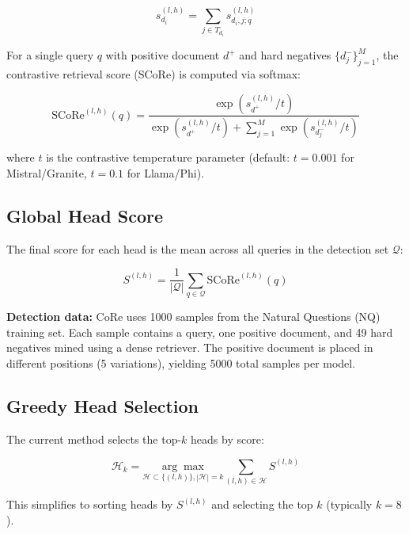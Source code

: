 \documentclass[11pt,a4paper]{article}
\begin{document}
\begin{equation}
    s^{(l,h)}_{d_i} = \sum_{j \in T_{d_i}} s^{(l,h)}_{d_i,j;q}
\end{equation}

For a single query $q$ with positive document $d^+$ and hard negatives $\{d^-_j\}_{j=1}^{M}$, the contrastive retrieval score (SCoRe) is computed via softmax:

\begin{equation}
    \text{SCoRe}^{(l,h)}(q) = \frac{\exp\left(s^{(l,h)}_{d^+} / t\right)}{\exp\left(s^{(l,h)}_{d^+} / t\right) + \sum_{j=1}^{M} \exp\left(s^{(l,h)}_{d^-_j} / t\right)}
\end{equation}

where $t$ is the contrastive temperature parameter (default: $t=0.001$ for Mistral/Granite, $t=0.1$ for Llama/Phi).

\subsection{Global Head Score}

The final score for each head is the mean across all queries in the detection set $\mathcal{Q}$:

\begin{equation}
    S^{(l,h)} = \frac{1}{|\mathcal{Q}|} \sum_{q \in \mathcal{Q}} \text{SCoRe}^{(l,h)}(q)
\end{equation}

\textbf{Detection data:} CoRe uses 1000 samples from the Natural Questions (NQ) training set. Each sample contains a query, one positive document, and 49 hard negatives mined using a dense retriever. The positive document is placed in different positions (5 variations), yielding 5000 total samples per model.

\subsection{Greedy Head Selection}

The current method selects the top-$k$ heads by score:

\begin{equation}
    \mathcal{H}_k = \underset{\mathcal{H} \subset \{(l,h)\}, |\mathcal{H}|=k}{\arg\max} \sum_{(l,h) \in \mathcal{H}} S^{(l,h)}
\end{equation}

This simplifies to sorting heads by $S^{(l,h)}$ and selecting the top $k$ (typically $k=8$).
\end{document}
